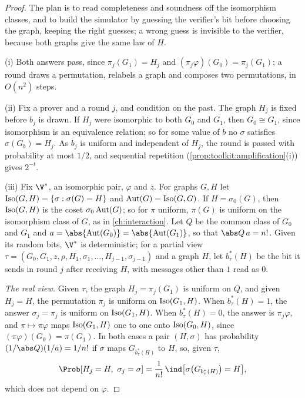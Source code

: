 \begin{refsection}
\begin{proof}
The plan is to read completeness and soundness off the isomorphism classes, and to build the simulator by guessing the verifier's bit before choosing the graph, keeping the right guesses; a wrong guess is invisible to the verifier, because both graphs give the same law of $H$.

(i) Both answers pass, since $\pi_j(G_1)=H_j$ and $(\pi_j\varphi)(G_0)=\pi_j(G_1)$; a round draws a permutation, relabels a graph and composes two permutations, in $O(n^2)$ steps.

(ii) Fix a prover and a round $j$, and condition on the past. The graph $H_j$ is fixed before $b_j$ is drawn. If $H_j$ were isomorphic to both $G_0$ and $G_1$, then $G_0\cong G_1$, since isomorphism is an equivalence relation; so for some value of $b$ no $\sigma$ satisfies $\sigma(G_b)=H_j$. As $b_j$ is uniform and independent of $H_j$, the round is passed with probability at most $1/2$, and sequential repetition (\cref{prop:toolkit:amplification}(i)) gives $2^{-t}$.

(iii) Fix $\V^*$, an isomorphic pair, $\varphi$ and $z$. For graphs $G,H$ let $\operatorname{Iso}(G,H)=\{\sigma:\sigma(G)=H\}$ and $\operatorname{Aut}(G)=\operatorname{Iso}(G,G)$. If $H=\sigma_0(G)$, then $\operatorname{Iso}(G,H)$ is the coset $\sigma_0\operatorname{Aut}(G)$; so for $\pi$ uniform, $\pi(G)$ is uniform on the isomorphism class of $G$, as in \cref{ch:interaction}. Let $Q$ be the common class of $G_0$ and $G_1$ and $a=\abs{\zeroknowledgeaut(G_0)}=\abs{\zeroknowledgeaut(G_1)}$, so that $\abs Q\,a=n!$. Given its random bits, $\V^*$ is deterministic; for a partial view $\tau=(G_0,G_1,z,\rho,H_1,\sigma_1,\dots,H_{j-1},\sigma_{j-1})$ and a graph $H$, let $b^*_\tau(H)$ be the bit it sends in round $j$ after receiving $H$, with messages other than $1$ read as $0$.

\emph{The real view.} Given $\tau$, the graph $H_j=\pi_j(G_1)$ is uniform on $Q$, and given $H_j=H$, the permutation $\pi_j$ is uniform on $\operatorname{Iso}(G_1,H)$. When $b^*_\tau(H)=1$, the answer $\sigma_j=\pi_j$ is uniform on $\operatorname{Iso}(G_1,H)$. When $b^*_\tau(H)=0$, the answer is $\pi_j\varphi$, and $\pi\mapsto\pi\varphi$ maps $\operatorname{Iso}(G_1,H)$ one to one onto $\operatorname{Iso}(G_0,H)$, since $(\pi\varphi)(G_0)=\pi(G_1)$. In both cases a pair $(H,\sigma)$ has probability $(1/\abs Q)(1/a)=1/n!$ if $\sigma$ maps $G_{b^*_\tau(H)}$ to $H$, so, given $\tau$,
\begin{equation}\label{eq:zeroknowledge:giround}
\Prob[H_j=H,\ \sigma_j=\sigma]=\frac1{n!}\,\ind\bigl[\sigma\bigl(G_{b^*_\tau(H)}\bigr)=H\bigr],
\end{equation}
which does not depend on $\varphi$.


\end{proof}
\end{refsection}
